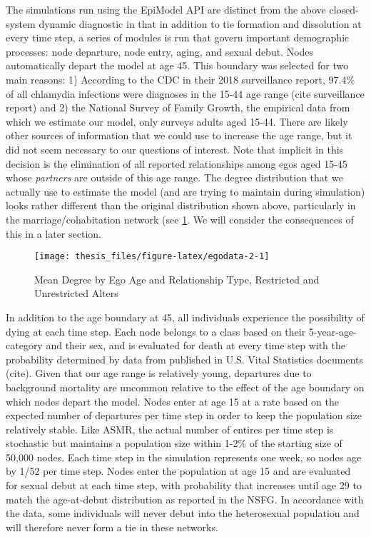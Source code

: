 \documentclass [11pt, proquest] {uwthesis}[2015/03/03]
\begin{document}
The simulations run using the EpiModel API are distinct from the above
closed-system dynamic diagnostic in that in addition to tie formation
and dissolution at every time step, a series of modules is run that
govern important demographic processes: node departure, node entry,
aging, and sexual debut. Nodes automatically depart the model at age 45.
This boundary was selected for two main reasons: 1) According to the CDC
in their 2018 surveillance report, 97.4\% of all chlamydia infections
were diagnoses in the 15-44 age range (cite surveillance report) and 2)
the National Survey of Family Growth, the empirical data from which we
estimate our model, only surveys adults aged 15-44. There are likely
other sources of information that we could use to increase the age
range, but it did not seem necessary to our questions of interest. Note
that implicit in this decision is the elimination of all reported
relationships among egos aged 15-45 whose \emph{partners} are outside of
this age range. The degree distribution that we actually use to estimate
the model (and are trying to maintain during simulation) looks rather
different than the original distribution shown above, particularly in
the marriage/cohabitation network (see \ref{fig:egodata-2}. We will
consider the consequences of this in a later section.
\begin{figure}

{\centering \texttt{[image: thesis\_files/figure-latex/egodata-2-1]} 

}

\caption{Mean Degree by Ego Age and Relationship Type, Restricted and Unrestricted Alters}\label{fig:egodata-2}
\end{figure}
In addition to the age boundary at 45, all individuals experience the
possibility of dying at each time step. Each node belongs to a class
based on their 5-year-age-category and their sex, and is evaluated for
death at every time step with the probability determined by data from
published in U.S. Vital Statistics documents (cite). Given that our age
range is relatively young, departures due to background mortality are
uncommon relative to the effect of the age boundary on which nodes
depart the model. Nodes enter at age 15 at a rate based on the expected
number of departures per time step in order to keep the population size
relatively stable. Like ASMR, the actual number of entires per time step
is stochastic but maintains a population size within 1-2\% of the
starting size of 50,000 nodes. Each time step in the simulation
represents one week, so nodes age by 1/52 per time step. Nodes enter the
population at age 15 and are evaluated for sexual debut at each time
step, with probability that increases until age 29 to match the
age-at-debut distribution as reported in the NSFG. In accordance with
the data, some individuals will never debut into the heterosexual
population and will therefore never form a tie in these networks.
\end{document}
